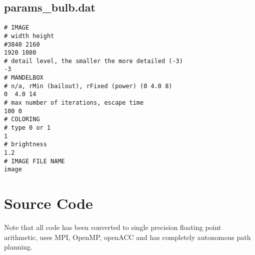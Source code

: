 \documentclass[]{article}
\begin{document}
\subsection{params\_bulb.dat}\label{subsec:params_bulb}
\begin{Verbatim}[fontsize= \footnotesize, tabsize=4]
# IMAGE
# width height
#3840 2160
1920 1080
# detail level, the smaller the more detailed (-3)
-3
# MANDELBOX
# n/a, rMin (bailout), rFixed (power) (0 4.0 8)
0  4.0 14
# max number of iterations, escape time
100 0
# COLORING
# type 0 or 1
1
# brightness
1.2
# IMAGE FILE NAME
image
\end{Verbatim}

\section{Source Code}
Note that all code has been converted to single precision floating point arithmetic, uses MPI,  OpenMP, openACC and has completely autonomous path planning.
\end{document}
